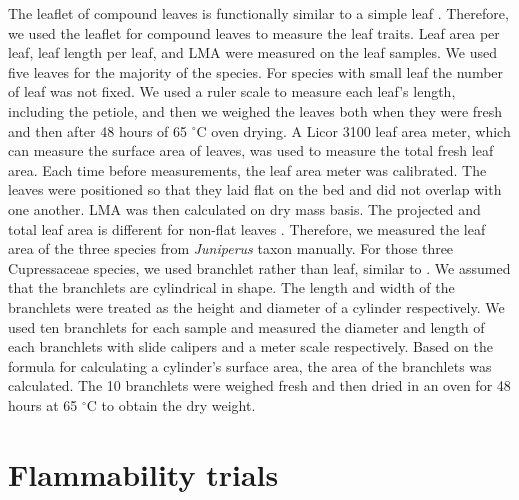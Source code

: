 \documentclass{bmcart}
\begin{document}
The leaflet of compound leaves is functionally similar to a simple leaf
\citep{perez2016corrigendum}. Therefore, we used the leaflet for compound leaves to measure the leaf traits. Leaf area per leaf, leaf length per leaf, and LMA were measured on the leaf samples. We used five leaves for the majority of the species. For species with small leaf the number of leaf was not fixed. We used a ruler scale to measure each leaf's length, including the petiole, and then we weighed the leaves both when they were fresh and then after 48 hours of 65 $^{\circ}$C oven drying. A Licor 3100 leaf area meter, which can measure the surface area of leaves, was used to measure the total fresh leaf area. Each time before measurements, the leaf area meter was calibrated. The leaves were positioned so that they laid flat on the bed and did not overlap with one another.   
LMA was then calculated on  dry mass basis. The projected and total leaf area is different for non-flat leaves \citep{perez2016corrigendum, cornelissen2003handbook}. Therefore, we measured the leaf area of the three species from \emph{Juniperus} taxon manually. For those three Cupressaceae species, we used branchlet rather than leaf, similar to \citet{schwilk2011scaling}. We assumed that the branchlets are cylindrical in shape. The length and width of the branchlets were treated as the height and diameter of a cylinder respectively. We used ten branchlets for each sample and measured the diameter and length of each branchlets with slide calipers and a meter scale respectively. Based on the formula for calculating a cylinder's surface area, the area of the branchlets was calculated. The 10 branchlets were weighed fresh and then dried in an oven for 48 hours at 65 $^{\circ}$C to obtain the dry weight.


\section*{Flammability trials}
\end{document}
